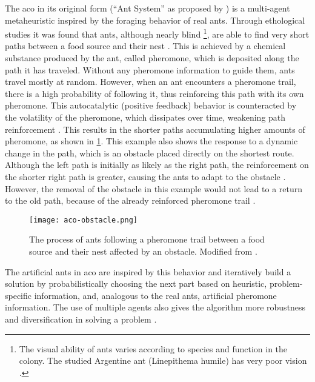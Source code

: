 The \gls{aco} in its original form (\enquote{Ant System} as proposed by \citet{dorigo1996ant}) is a multi-agent metaheuristic inspired by the foraging behavior of real ants.
 Through ethological studies it was found that ants, although nearly blind \footnote{The visual ability of ants varies according to species and function in the colony. The studied Argentine ant (Linepithema humile) has very poor vision \cite{talbi2009metaheuristics}.}, are able to find very short paths between a food source and their nest \cite{goss1989self}. This is achieved by a chemical substance produced by the ant, called pheromone, which is deposited along the path it has traveled. Without any pheromone information to guide them, ants travel mostly at random. However, when an ant encounters a pheromone trail, there is a high probability of following it, thus reinforcing this path with its own pheromone. This autocatalytic (positive feedback) behavior is counteracted by the volatility of the pheromone, which dissipates over time, weakening path reinforcement \cite{dorigo1996ant}. This results in the shorter paths accumulating higher amounts of pheromone, as shown in \cref{fig:aco-obstacle}. This example also shows the response to a dynamic change in the path, which is an obstacle placed directly on the shortest route. Although the left path is initially as likely as the right path, the reinforcement on the shorter right path is greater, causing the ants to adapt to the obstacle \cite{talbi2009metaheuristics}. However, the removal of the obstacle in this example would not lead to a return to the old path, because of the already reinforced pheromone trail \cite{dorigo2004ant}.

\begin{figure}[h]
	\centering
	\texttt{[image: aco-obstacle.png]}
	\caption[The process of ants following a pheromone trail]{The process of ants following a pheromone trail between a food source and their nest affected by an obstacle. Modified from \citet{talbi2009metaheuristics}.}
	\label{fig:aco-obstacle}
\end{figure}

The artificial ants in \gls{aco} are inspired by this behavior and iteratively build a solution by probabilistically choosing the next part based on heuristic, problem-specific information, and, analogous to the real ants, artificial pheromone information. The use of multiple agents also gives the algorithm more robustness and diversification in solving a problem \cite{dorigo2019ant}.

